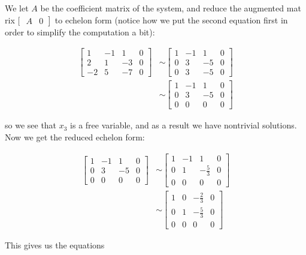 \begin{solution}
    We let $A$ be the coefficient matrix of the system, and reduce the augmented mat rix [ $\left.\begin{array}{cc}A & 0\end{array}\right]$ to echelon form (notice how we put the second equation first in order to simplify the computation a bit):

\[
\begin{aligned}
{\left[\begin{array}{cccc}
1 & -1 & 1 & 0 \\
2 & 1 & -3 & 0 \\
-2 & 5 & -7 & 0
\end{array}\right] } & \sim\left[\begin{array}{cccc}
1 & -1 & 1 & 0 \\
0 & 3 & -5 & 0 \\
0 & 3 & -5 & 0
\end{array}\right] \\
& \sim\left[\begin{array}{cccc}
1 & -1 & 1 & 0 \\
0 & 3 & -5 & 0 \\
0 & 0 & 0 & 0
\end{array}\right]
\end{aligned}
\]

so we see that $x_3$ is a free variable, and as a result we have nontrivial solutions. Now we get the reduced echelon form:

\[
\begin{aligned}
{\left[\begin{array}{cccc}
1 & -1 & 1 & 0 \\
0 & 3 & -5 & 0 \\
0 & 0 & 0 & 0
\end{array}\right] } & \sim\left[\begin{array}{cccc}
1 & -1 & 1 & 0 \\
0 & 1 & -\frac{5}{3} & 0 \\
0 & 0 & 0 & 0
\end{array}\right] \\
& \sim\left[\begin{array}{cccc}
1 & 0 & -\frac{2}{3} & 0 \\
0 & 1 & -\frac{5}{3} & 0 \\
0 & 0 & 0 & 0
\end{array}\right]
\end{aligned}
\]

This gives us the equations


\end{solution}
